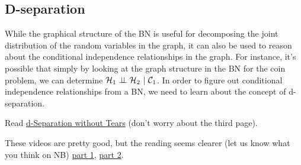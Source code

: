 \documentclass[assignment02_Solutions]{subfiles}
\begin{document}
\subsection{D-separation}
While the graphical structure of the BN is useful for decomposing the joint distribution of the random variables in the graph, it can also be used to reason about the conditional independence relationships in the graph.  For instance, it's possible that simply by looking at the graph structure in the BN for the coin problem, we can determine $\mathcal{H}_1 \perp\!\!\!\perp \mathcal{H}_2~|~\mathcal{C}_1$.  In order to figure out conditional independence relationships from a BN, we need to learn about the concept of d-separation.

\begin{externalresources}[(30 minutes)]
\bi
\item Read \href{http://nb.mit.edu/f/56085}{d-Separation without Tears} (don't worry about the third page).
\item These videos are pretty good, but the reading seems clearer (let us know what you think on NB) \href{https://www.youtube.com/watch?v=IjoWqnH6HmU}{part 1}, \href{https://www.youtube.com/watch?v=zJIK5uOyJi0}{part 2}.
\ei
\end{externalresources}
\end{document}
